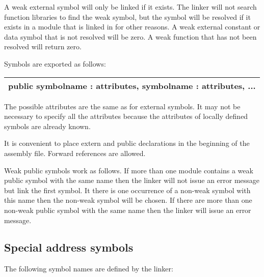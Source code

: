\documentclass[forwardcom.tex]{subfiles}
\begin{document}
A weak external symbol will only be linked if it exists. The linker will not search function libraries to find the weak symbol, but the symbol will be resolved if it exists in a module that is linked in for other reasons.
A weak external constant or data symbol that is not resolved will be zero. A weak function that has not  been resolved will return zero.
\vv

Symbols are exported as follows:
\vv

\begin{tabular}{|p{150mm}|}
\hline
\hspace{4mm} public symbolname : attributes, symbolname : attributes, ...\\
\hline
\end{tabular}
\vv

The possible attributes are the same as for external symbols. It may not be necessary to specify all the attributes because the attributes of locally defined symbols are already known. 
\vv

It is convenient to place extern and public declarations in the beginning of the assembly file. Forward references are allowed.
\vv

Weak public symbols work as follows. If more than one module contains a weak public symbol with the same name then the linker will not issue an error message but link the first symbol.
It there is one occurrence of a non-weak symbol with this name then the non-weak symbol will be chosen. If there are more than one non-weak public symbol with the same name then the linker will issue an error message.
\vv

\subsection{Special address symbols} \label{SpecialAddressSymbols}
The following symbol names are defined by the linker:
\end{document}
